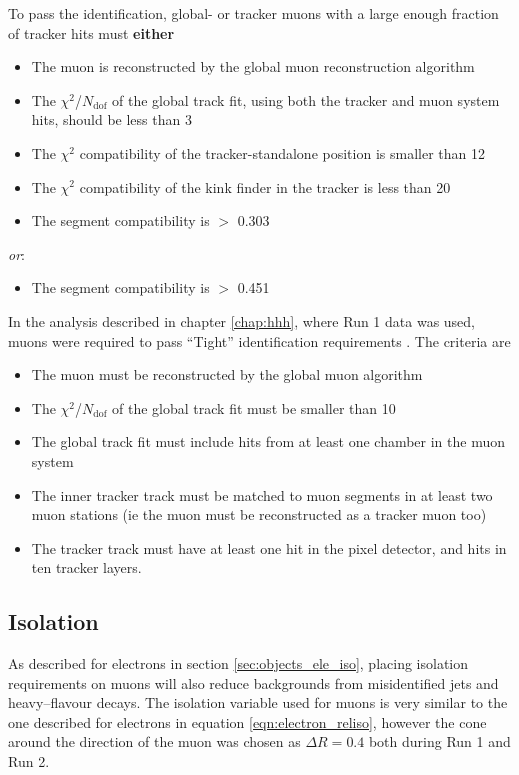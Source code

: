 To pass the identification, global- or tracker muons
with a large enough fraction of tracker hits must  \textbf{either} 
\begin{itemize}
\setlength{\itemsep}{-\baselineskip}
\item The muon is reconstructed by the global muon reconstruction algorithm
\item The $\chi^2$/$N_{\text{dof}}$ of the global track fit, using both the tracker and muon system hits, should be less than 3
\item The $\chi^2$ compatibility of the tracker-standalone position is smaller than 12
\item The $\chi^2$ compatibility of the kink finder in the tracker is less than 20
\item The segment compatibility is $>$ 0.303
\end{itemize}
\textit{or}:
\begin{itemize}
\item The segment compatibility is $>$ 0.451
\end{itemize}

In the analysis described in chapter \ref{chap:hhh}, where Run 1 data 
was used, muons were required to pass ``Tight'' identification requirements \cite{cms-muon-reco}. 
The criteria are
\begin{itemize}
\setlength{\itemsep}{-\baselineskip}
\item The muon must be reconstructed by the global muon algorithm
\item The $\chi^2$/$N_{\text{dof}}$ of the global track fit must be smaller than 10
\item The global track fit must include hits from at least one chamber in the muon system
\item The inner tracker track must be matched to muon segments in at least two muon stations (ie the muon must be reconstructed as a tracker muon too)
\item The tracker track must have at least one hit in the pixel detector, and hits in ten tracker layers.
\end{itemize}

\subsection{Isolation}
\label{sec:objects_muo_iso}
As described for electrons in section \ref{sec:objects_ele_iso}, placing isolation 
requirements on muons will also reduce backgrounds from misidentified jets and heavy--flavour
decays. The isolation variable used for muons is very similar to the one described for
electrons in equation \ref{eqn:electron_reliso}, however the cone around the direction of the
muon was chosen as $\Delta R = 0.4$ both during Run 1 and Run 2.

